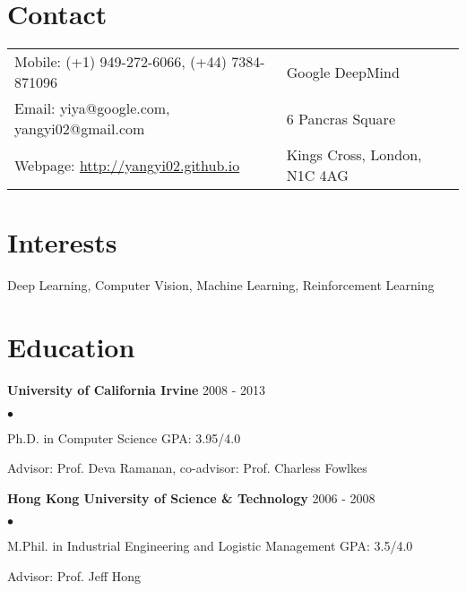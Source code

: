 \documentclass[margin]{res3}
\newenvironment{list2}{
  \begin{list}{$\bullet$}{%
      \setlength{\itemsep}{0.02in}
      \setlength{\parsep}{0in} \setlength{\parskip}{0in}
      \setlength{\topsep}{0in} \setlength{\partopsep}{0in}
      \setlength{\leftmargin}{0.2in}}}{\end{list}}
\begin{document}
\begin{resume}

\section{\sc Contact}
\begin{tabular}{@{}p{4.15in}p{2.15in}}
  Mobile: (+1) 949-272-6066, (+44) 7384-871096 & Google DeepMind\\
  Email: yiya@google.com, yangyi02@gmail.com & 6 Pancras Square\\
  Webpage: \url{http://yangyi02.github.io} & Kings Cross, London, N1C 4AG\\
\end{tabular}


\section{\sc Interests}
Deep Learning, Computer Vision, Machine Learning, Reinforcement Learning


\section{\sc Education}
{\bf University of California Irvine} \hfill{2008 - 2013}
\begin{list2}
\item Ph.D. in Computer Science \hfill{GPA: 3.95/4.0}
\vspace{-2pt}
\item Advisor: Prof. Deva Ramanan, co-advisor: Prof. Charless Fowlkes 
\end{list2}
\vspace{-2pt}\vspace{-2pt}\vspace{-2pt}

{\bf Hong Kong University of Science \& Technology} \hfill {2006 - 2008}
\begin{list2}
\item M.Phil. in Industrial Engineering and Logistic Management \hfill {GPA: 3.5/4.0}
\vspace{-2pt}
\item Advisor: Prof. Jeff Hong 
\end{list2}
\vspace{-2pt}\vspace{-2pt}\vspace{-2pt}


\end{resume}
\end{document}
